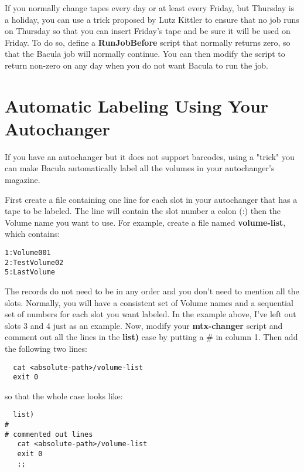 If you normally change tapes every day or at least every Friday, but Thursday
is a holiday, you can use a trick proposed by Lutz Kittler to ensure that no
job runs on Thursday so that you can insert Friday's tape and be sure it will
be used on Friday. To do so, define a {\bf RunJobBefore} script that normally
returns zero, so that the Bacula job will normally continue. You can then
modify the script to return non-zero on any day when you do not want Bacula to
run the job. 

\section{Automatic Labeling Using Your Autochanger}
\label{autolabel}

If you have an autochanger but it does not support barcodes, using a "trick"
you can make Bacula automatically label all the volumes in your autochanger's
magazine. 

First create a file containing one line for each slot in your autochanger that
has a tape to be labeled. The line will contain the slot number a colon (:)
then the Volume name you want to use. For example, create a file named {\bf
volume-list}, which contains: 

\footnotesize
\begin{verbatim}
1:Volume001
2:TestVolume02
5:LastVolume
\end{verbatim}
\normalsize

The records do not need to be in any order and you don't need to mention all
the slots. Normally, you will have a consistent set of Volume names and a
sequential set of numbers for each slot you want labeled. In the example
above, I've left out slots 3 and 4 just as an example. Now, modify your {\bf
mtx-changer} script and comment out all the lines in the {\bf list)} case by
putting a \# in column 1. Then add the following two lines: 

\footnotesize
\begin{verbatim}
  cat <absolute-path>/volume-list
  exit 0
\end{verbatim}
\normalsize

so that the whole case looks like: 

\footnotesize
\begin{verbatim}
  list)
#
# commented out lines
   cat <absolute-path>/volume-list
   exit 0
   ;;
\end{verbatim}
\normalsize

